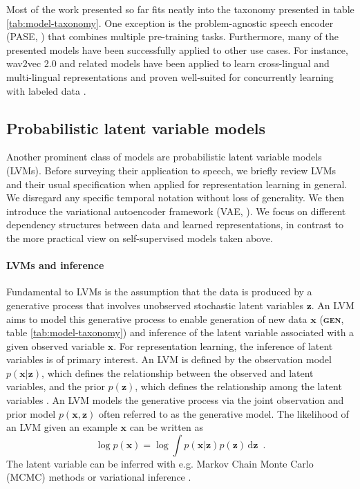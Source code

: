 {Most of the work presented so far fits neatly into the taxonomy presented in table \ref{tab:model-taxonomy}. One exception is the problem-agnostic speech encoder (PASE, \citealp{pascual_learning_2019, ravanelli_multitask_2020}) that combines multiple pre-training tasks. Furthermore, many of the presented models have been successfully applied to other use cases. For instance, wav2vec 2.0 and related models have been applied to learn cross-lingual and multi-lingual representations \cite{riviere_unsupervised_2020, conneau_unsupervised_2020, khurana_magic_2021} and proven well-suited for concurrently learning with labeled data \cite{talnikar_joint_2021, wang_unispeech_2021}. %


\subsection{Probabilistic latent variable models}
\label{sec:plvms}
Another prominent class of models are probabilistic latent variable models (LVMs). 
Before surveying their application to speech, we briefly review LVMs and their usual specification when applied for representation learning in general. We disregard any specific temporal notation without loss of generality. 
We then introduce the variational autoencoder framework (VAE, \citealp{kingma_autoencoding_2014}). We focus on different dependency structures between data and learned representations, in contrast to the more practical view on self-supervised models taken above.

\paragraph{LVMs and inference}
Fundamental to LVMs is the assumption that the data is produced by a generative process that involves unobserved stochastic latent variables $\textbf{z}$. 
An LVM aims to model this generative process to enable generation of new data $\mathbf{x}$ (\textbf{\textsc{gen}}, table \ref{tab:model-taxonomy}) and inference of the latent variable associated with a given observed variable $\textbf{x}$. 
For representation learning, the inference of latent variables is of primary interest.
An LVM is defined by the observation model $p(\mathbf{x}|\mathbf{z})$, which defines the relationship between the observed and latent variables, and the prior $p(\mathbf{z})$, which defines the relationship among the latent variables \cite{bartholomew_latent_2011}. 
An LVM models the generative process via the joint observation and prior model $p(\mathbf{x}, \mathbf{z})$ often referred to as the generative model. 
The likelihood of an LVM given an example $\textbf{x}$ can be written as
\begin{equation}
    \log p(\mathbf{x}) = \log \int p(\mathbf{x}|\mathbf{z}) p(\mathbf{z}) \,\text{d}\mathbf{z} \enspace.
    \label{eq_brief: lvm log-likelihood}
\end{equation}
The latent variable can be inferred with e.g. Markov Chain Monte Carlo (MCMC) methods \cite{mohamed_monte_2019} or variational inference \cite{jordan_introduction_1999}.

}
